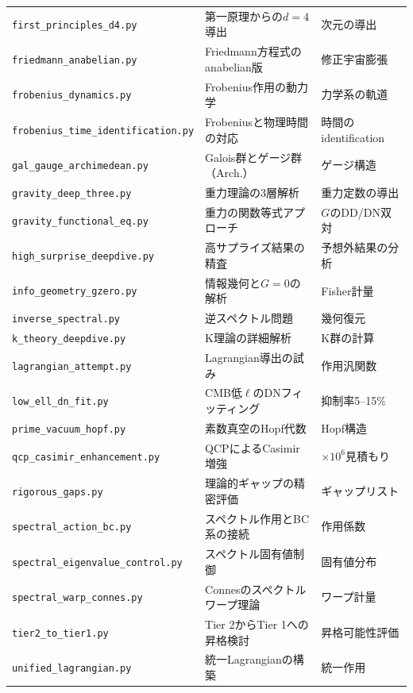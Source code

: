 \documentclass[11pt,a4paper]{article}
\begin{document}
\begin{longtable}{@{}p{5.5cm}p{5cm}p{4cm}@{}}
\texttt{first\_principles\_d4.py} & 第一原理からの$d=4$導出 & 次元の導出 \\
\texttt{friedmann\_anabelian.py} & Friedmann方程式のanabelian版 & 修正宇宙膨張 \\
\texttt{frobenius\_dynamics.py} & Frobenius作用の動力学 & 力学系の軌道 \\
\texttt{frobenius\_time\allowbreak \_identification.py} & Frobeniusと物理時間の対応 & 時間のidentification \\
\texttt{gal\_gauge\_archimedean.py} & Galois群とゲージ群（Arch.） & ゲージ構造 \\
\texttt{gravity\_deep\_three.py} & 重力理論の3層解析 & 重力定数の導出 \\
\texttt{gravity\_functional\_eq.py} & 重力の関数等式アプローチ & $G$のDD/DN双対 \\
\texttt{high\_surprise\_deepdive.py} & 高サプライズ結果の精査 & 予想外結果の分析 \\
\texttt{info\_geometry\_gzero.py} & 情報幾何と$G=0$の解析 & Fisher計量 \\
\texttt{inverse\_spectral.py} & 逆スペクトル問題 & 幾何復元 \\
\texttt{k\_theory\_deepdive.py} & K理論の詳細解析 & K群の計算 \\
\texttt{lagrangian\_attempt.py} & Lagrangian導出の試み & 作用汎関数 \\
\texttt{low\_ell\_dn\_fit.py} & CMB低$\ell$のDNフィッティング & 抑制率5--15\% \\
\texttt{prime\_vacuum\_hopf.py} & 素数真空のHopf代数 & Hopf構造 \\
\texttt{qcp\_casimir\allowbreak \_enhancement.py} & QCPによるCasimir増強 & $\times 10^6$見積もり \\
\texttt{rigorous\_gaps.py} & 理論的ギャップの精密評価 & ギャップリスト \\
\texttt{spectral\_action\_bc.py} & スペクトル作用とBC系の接続 & 作用係数 \\
\texttt{spectral\_eigenvalue\allowbreak \_control.py} & スペクトル固有値制御 & 固有値分布 \\
\texttt{spectral\_warp\_connes.py} & Connesのスペクトルワープ理論 & ワープ計量 \\
\texttt{tier2\_to\_tier1.py} & Tier 2からTier 1への昇格検討 & 昇格可能性評価 \\
\texttt{unified\_lagrangian.py} & 統一Lagrangianの構築 & 統一作用 \\
\bottomrule
\end{longtable}
\end{document}
